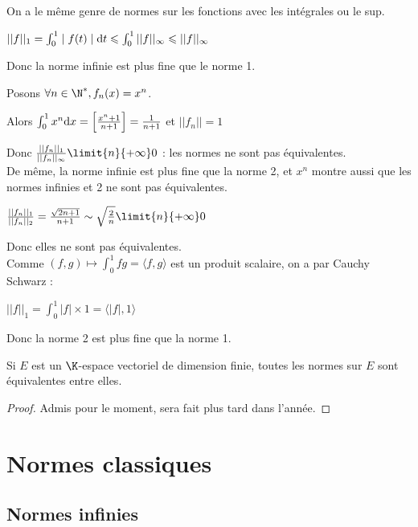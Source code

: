 \begin{exemple}
    On a le même genre de normes sur les fonctions avec les intégrales ou le sup. 

    $|| f ||_1 = \int_{0}^{1} \mid f(t) \mid \text d t \leqslant \int_{0}^{1} ||f||_\infty \leqslant ||f ||_\infty$

    Donc la norme infinie est plus fine que le norme 1. 

    Posons $\forall n \in \N^*, f_n (x) = x^n$. 

    Alors $\int_{0}^{1} x^n \text d x = \left[\frac {x^n + 1}{n+ 1}\right] = \frac 1 {n + 1}$
    et $||f_n|| = 1$

    Donc $\frac{||f_n||_1}{||f_n||_\infty} \limit{n}{+ \infty} 0$ : les normes ne sont pas équivalentes. \\

    De même, la norme infinie est plus fine que la norme 2, et $x^n$ montre aussi 
    que les normes infinies et 2 ne sont pas équivalentes.

    $\frac{||f_n||_1}{||f_n||_2} = \frac{\sqrt{2n + 1}}{n+1} \sim \sqrt{\frac 2 n} \limit{n}{+ \infty} 0$

    Donc elles ne sont pas équivalentes. \\

    Comme $(f, g) \mapsto \int_{0}^{1}fg = \langle f, g \rangle$ est un produit scalaire, on 
    a par Cauchy Schwarz : 

    $||f||_1 = \int_{0}^{1} |f| \times 1 = \langle |f|, 1 \rangle$

        Donc la norme 2 est plus fine que la norme 1. 
\end{exemple}

\begin{theorement}{}{}
    Si $E$ est un $\K$-espace vectoriel de dimension finie, toutes les normes 
    sur $E$ sont équivalentes entre elles.
\end{theorement}

\begin{proof}
    Admis pour le moment, sera fait plus tard dans l'année.
\end{proof}

\section{Normes classiques}

\subsection{Normes infinies}

